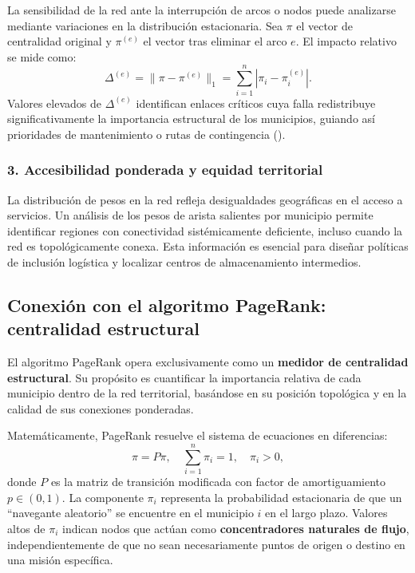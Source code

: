 \documentclass[
  spanish,
  us-letterpaper,
]{scrreprt}
\numberwithin{equation}{section}
\begin{document}
La sensibilidad de la red ante la interrupción de arcos o nodos puede
analizarse mediante variaciones en la distribución estacionaria. Sea
\(\pi\) el vector de centralidad original y \(\pi^{(e)}\) el vector tras
eliminar el arco \(e\). El impacto relativo se mide como: \[
\Delta^{(e)} = \|\pi - \pi^{(e)}\|_1 = \sum_{i=1}^n |\pi_i - \pi_i^{(e)}|.
\] Valores elevados de \(\Delta^{(e)}\) identifican enlaces críticos
cuya falla redistribuye significativamente la importancia estructural de
los municipios, guiando así prioridades de mantenimiento o rutas de
contingencia ().

\subsubsection{3. Accesibilidad ponderada y equidad
territorial}\label{accesibilidad-ponderada-y-equidad-territorial}

La distribución de pesos en la red refleja desigualdades geográficas en
el acceso a servicios. Un análisis de los pesos de arista salientes por
municipio permite identificar regiones con conectividad sistémicamente
deficiente, incluso cuando la red es topológicamente conexa. Esta
información es esencial para diseñar políticas de inclusión logística y
localizar centros de almacenamiento intermedios.

\subsection{Conexión con el algoritmo PageRank: centralidad
estructural}\label{conexiuxf3n-con-el-algoritmo-pagerank-centralidad-estructural}

El algoritmo PageRank opera exclusivamente como un \textbf{medidor de
centralidad estructural}. Su propósito es cuantificar la importancia
relativa de cada municipio dentro de la red territorial, basándose en su
posición topológica y en la calidad de sus conexiones ponderadas.

Matemáticamente, PageRank resuelve el sistema de ecuaciones en
diferencias: \[
\pi = P\pi, \quad \sum_{i=1}^n \pi_i = 1, \quad \pi_i > 0,
\] donde \(P\) es la matriz de transición modificada con factor de
amortiguamiento \(p \in (0,1)\). La componente \(\pi_i\) representa la
probabilidad estacionaria de que un ``navegante aleatorio'' se encuentre
en el municipio \(i\) en el largo plazo. Valores altos de \(\pi_i\)
indican nodos que actúan como \textbf{concentradores naturales de
flujo}, independientemente de que no sean necesariamente puntos de
origen o destino en una misión específica.
\end{document}
